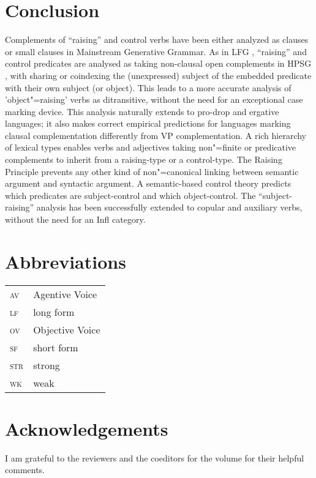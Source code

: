 \documentclass[output=paper
	        ,collection
	        ,collectionchapter
 	        ,biblatex
                ,babelshorthands
                ,newtxmath
                ,draftmode
                ,colorlinks, citecolor=brown
]{langscibook}
\begin{document}
\section{Conclusion}
Complements of ``raising'' and control verbs have been either analyzed as clauses \citep{Chomsky81a} or small clauses \citep{Stowell81a-u,Stowell1983} in Mainstream Generative Grammar.
As in LFG \citep{Bresnan1982}, ``raising'' and control predicates are analysed as taking non-clausal open complements in HPSG \citep{PollardandSag1994}, with sharing or coindexing the (unexpressed) subject of the embedded predicate with their own subject (or object). This leads to a more accurate analysis of 'object"=raising' verbs as ditransitive, without the need for an exceptional case marking device. This analysis naturally extends to pro-drop and ergative languages; it also makes correct empirical predictions for languages marking clausal complementation differently from VP complementation. A rich hierarchy of lexical types enables verbs and adjectives taking non"=finite or predicative complements to inherit from a raising-type or a control-type. The Raising Principle prevents any other kind of non"=canonical linking between semantic argument and syntactic argument. A semantic-based control theory predicts which predicates are subject-control and which object-control. The ``subject-raising'' analysis has been successfully extended to copular and auxiliary verbs, without the need for an Infl category.




\section*{Abbreviations}

\begin{tabularx}{.45\textwidth}{lX}
\textsc{av} & Agentive Voice\\
\textsc{lf} & long form\\ 
\textsc{ov} & Objective Voice\\
\textsc{sf} & short form\\
\textsc{str} & strong\\
\textsc{wk} & weak\\

\end{tabularx}

\section*{Acknowledgements}

I am grateful to the reviewers and the coeditors for the volume for their helpful comments.
{\sloppy
\printbibliography[heading=subbibliography,notkeyword=this] 
}
\end{document}
